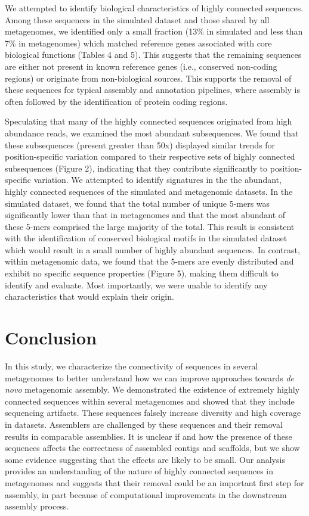 \documentclass[10pt]{article}
\begin{document}
We attempted to identify biological characteristics of highly
connected sequences.  Among these sequences in the simulated dataset
and those shared by all metagenomes, we identified only a small
fraction (13\% in simulated and less than 7\% in metagenomes) which
matched reference genes associated with core biological functions
(Tables 4 and 5).  This suggests that the remaining sequences are
either not present in known reference genes (i.e., conserved
non-coding regions) or originate from non-biological sources.  This
supports the removal of these sequences for typical assembly and
annotation pipelines, where assembly is often followed by the
identification of protein coding regions.

Speculating that many of the highly connected sequences originated
from high abundance reads, we examined the most abundant subsequences.
We found that these subsequences (present greater than 50x) displayed
similar trends for position-specific variation compared to their
respective sets of highly connected subsequences (Figure 2),
indicating that they contribute significantly to position-specific
variation.  We attempted to identify signatures in the the abundant,
highly connected sequences of the simulated and metagenomic datasets.
In the simulated dataset, we found that the total number of unique
5-mers was significantly lower than that in metagenomes and that the
most abundant of these 5-mers comprised the large majority of the
total.  This result is consistent with the identification of conserved
biological motifs in the simulated dataset which would result in a
small number of highly abundant sequences.  In contrast, within
metagenomic data, we found that the 5-mers are evenly distributed and
exhibit no specific sequence properties (Figure 5), making them
difficult to identify and evaluate.  Most importantly, we were
unable to identify any characteristics that would explain their origin.

\section*{Conclusion}

In this study, we characterize the connectivity of sequences in
several metagenomes to better understand how we can improve approaches
towards {\em de novo} metagenomic assembly.  We demonstrated the
existence of extremely highly connected sequences within several
metagenomes and showed that they include sequencing artifacts.  These
sequences falsely increase diversity and high coverage in datasets.
Assemblers are challenged by these sequences and their removal results
in comparable assemblies.  It is unclear if and how the presence of
these sequences affects the correctness of assembled contigs and
scaffolds, but we show some evidence suggesting that the effects are
likely to be small.  Our analysis provides an understanding of the
nature of highly connected sequences in metagenomes and suggests that
their removal could be an important first step for assembly, in part
because of computational improvements in the downstream assembly
process.
\end{document}
